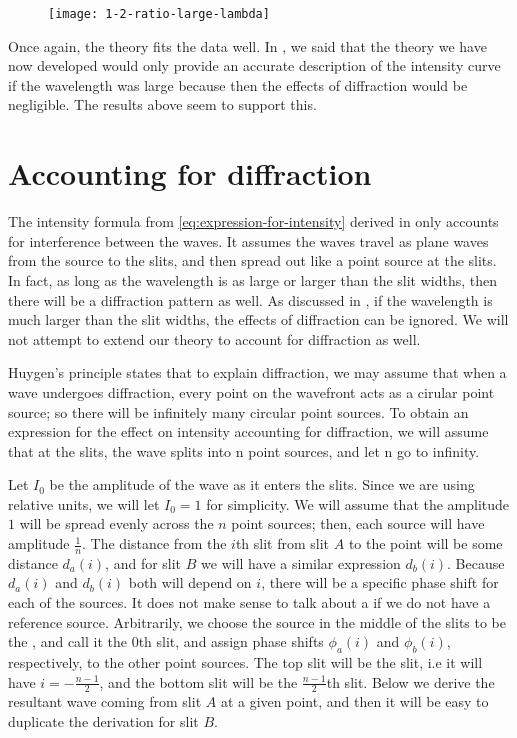 \documentclass{paper}
\begin{document}
\begin{figure}[H]
\label{fig:1-2-ratio-large-lambda}
    \texttt{[image: 1-2-ratio-large-lambda]}
\end{figure}

Once again, the theory fits the data well.
In , we said that the theory we have now developed
would only provide an accurate description of the intensity curve if the wavelength was large because
then the effects of diffraction would be negligible.
The results above seem to support this.

\section{Accounting for diffraction}
\label{section:accounting-for-diffraction}

The intensity formula from \eqref{eq:expression-for-intensity} derived in  only accounts for interference between the waves. It assumes the waves travel as plane waves from the source to the slits, and then spread out like a point source at the slits. In fact, as long as the wavelength is as large or larger than the slit widths, then there will be a diffraction pattern as well. As discussed in , if the wavelength is much larger than the slit widths, the effects of diffraction can be ignored. We will not attempt to extend our theory to account for diffraction as well.

Huygen’s principle \parencite{huygens-principle} states that to explain diffraction, we may assume that when a wave undergoes diffraction, every point on the wavefront
acts as a cirular point source; so there will be infinitely many circular point
sources. To obtain an expression for the effect on intensity accounting for diffraction, we will assume that at the slits, the wave splits into n point sources, and let n go
to infinity.

Let $I_0$ be the amplitude of the wave as it enters the slits. Since we are using relative units, we will let $I_0 = 1$ for simplicity. We will assume that the amplitude $1$ will be spread evenly across the $n$ point sources; then, each source will have amplitude $\frac{1}{n}$. The distance from the $i$th slit from slit $A$ to the point will be some distance $d_a(i)$, and for slit $B$ we will have a similar expression $d_b(i)$. Because $d_a(i)$ and $d_b(i)$ both will depend on $i$, there will be a specific phase shift for each of the sources. It does not make sense to talk about a  if we do not have a reference source. Arbitrarily, we choose the source in the middle of the slits to be the , and call it the $0$th slit, and assign phase shifts $\phi_a(i)$ and $\phi_b(i)$, respectively, to the other point sources. The top slit will be the  slit, i.e it will have $i = -\frac{n - 1}{2}$, and the bottom slit will be the $\frac{n - 1}{2}$th slit. Below we derive the resultant wave coming from slit $A$ at a given point, and then it will be easy to duplicate the derivation for slit $B$.
\end{document}
